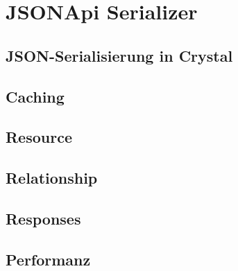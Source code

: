 \section{JSONApi Serializer}
\label{sec:b-jsonapi-serializer}

\subsection{JSON-Serialisierung in Crystal}
\label{ssec:bj-json-serialisierung-in-crystal}

\subsection{Caching}
\label{ssec:bj-caching}

\subsection{Resource}
\label{ssec:bj-resource}

\subsection{Relationship}
\label{ssec:bj-relationship}

\subsection{Responses}
\label{ssec:bj-responses}

\subsection{Performanz}
\label{ssec:bj-performance}
